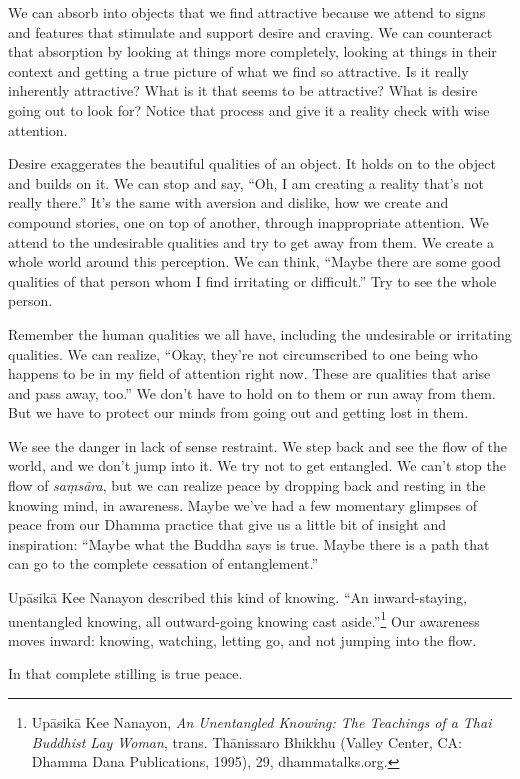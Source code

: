We can absorb into objects that we find attractive because we attend to signs and features that stimulate and support desire and craving. We can counteract that absorption by looking at things more completely, looking at things in their context and getting a true picture of what we find so attractive. Is it really inherently attractive? What is it that seems to be attractive? What is desire going out to look for? Notice that process and give it a reality check with wise attention.

Desire exaggerates the beautiful qualities of an object. It holds on to the object and builds on it. We can stop and say, ``Oh, I am creating a reality that's not really there.'' It's the same with aversion and dislike, how we create and compound stories, one on top of another, through inappropriate attention. We attend to the undesirable qualities and try to get away from them. We create a whole world around this perception. We can think, ``Maybe there are some good qualities of that person whom I find irritating or difficult.'' Try to see the whole person.

Remember the human qualities we all have, including the undesirable or irritating qualities. We can realize, ``Okay, they're not circumscribed to one being who happens to be in my field of attention right now. These are qualities that arise and pass away, too.'' We don't have to hold on to them or run away from them. But we have to protect our minds from going out and getting lost in them.

We see the danger in lack of sense restraint. We step back and see the flow of the world, and we don't jump into it. We try not to get entangled. We can't stop the flow of \emph{saṃsāra}, but we can realize peace by dropping back and resting in the knowing mind, in awareness. Maybe we've had a few momentary glimpses of peace from our Dhamma practice that give us a little bit of insight and inspiration: ``Maybe what the Buddha says is true. Maybe there is a path that can go to the complete cessation of entanglement.''

Upāsikā Kee Nanayon described this kind of knowing. ``An inward-staying, unentangled knowing, all \mbox{outward-going} knowing cast aside.''\footnote{Upāsikā Kee Nanayon, \emph{An Unentangled Knowing: The Teachings of a Thai Buddhist Lay Woman}, trans. Thānissaro Bhikkhu (Valley Center, CA: Dhamma Dana Publications, 1995), 29, dhammatalks.org.} Our awareness moves inward: knowing, watching, letting go, and not jumping into the flow.

In that complete stilling is true peace.
